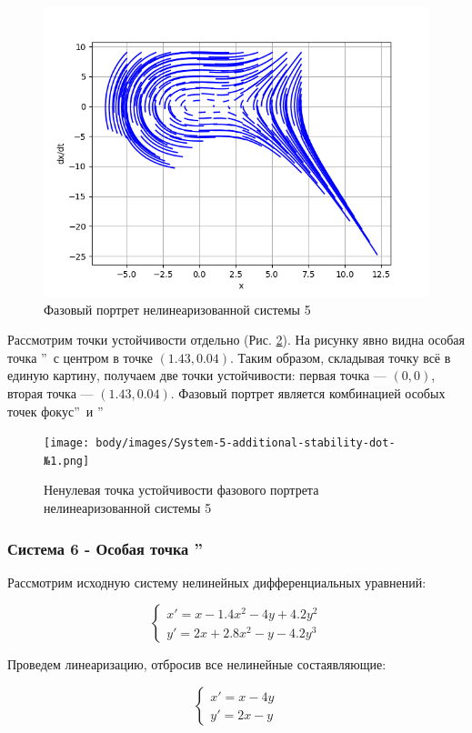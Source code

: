 \begin{figure}[H]
	\centering
	\includegraphics[width=0.6\linewidth]{body/images/System-5.png}
	\caption{Фазовый портрет нелинеаризованной системы 5}
	\label{fig:13}
\end{figure}

Рассмотрим точки устойчивости отдельно (Рис. \ref{fig:14}). На рисунку явно видна особая
точка \textquotedblright\ с центром в точке $(1.43, 0.04)$. Таким образом,
складывая точку всё в единую картину, получаем две точки устойчивости: первая точка — $(0, 0)$,
вторая точка — $(1.43, 0.04)$. Фазовый портрет является комбинацией особых точек
 фокус\textquotedblright\ и \textquotedblright

\begin{figure}[H]
	\centering
	\texttt{[image: body/images/System-5-additional-stability-dot-№1.png]}
	\caption{Ненулевая точка устойчивости фазового портрета нелинеаризованной системы 5}
	\label{fig:14}
\end{figure}

\subsubsection{Система 6 - Особая точка \textquotedblright}

Рассмотрим исходную систему нелинейных дифференциальных уравнений:

$$
\begin{cases}
x' = x - 1.4 x^2 - 4y + 4.2y^2\\
y' = 2x + 2.8x^2 - y - 4.2y^3
\end{cases}
$$

Проведем линеаризацию, отбросив все нелинейные состаявляющие:

$$
\begin{cases}
	x' = x - 4y\\
	y' = 2x - y
\end{cases}
$$

